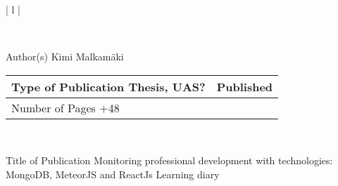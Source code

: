 \begin{tabular}{ | l | }

    \\

    \hline
    \begin{minipage}[b]{6cm}
        Author(s)
        \newline
        Kimi Malkamäki 
    \end{minipage}%
    \begin{minipage}{8.5cm}
        \begin{tabular}{ | l | c | }
            \begin{minipage}[t][1cm][t]{4.25cm}
                Type of Publication 
                \newline
                Thesis, UAS?
            \end{minipage} & %
            \begin{minipage}{3.6cm}
                Published
                \newline
                2024
            \end{minipage} \\ \hline%
            \begin{minipage}[t][1.01cm][t]{4.25cm}
                Number of Pages
                \newline 
                31+48
            \end{minipage}
            &  \\ \hline
        \end{tabular}
    \end{minipage}%
      \\ \hline

    \begin{minipage}[t][2cm][t]{14cm}
    Title of Publication
        \newline 
        Monitoring professional development with technologies: MongoDB, MeteorJS and ReactJs
        \newline 
    Learning diary  
    \end{minipage}\\ \hline


\end{tabular}
